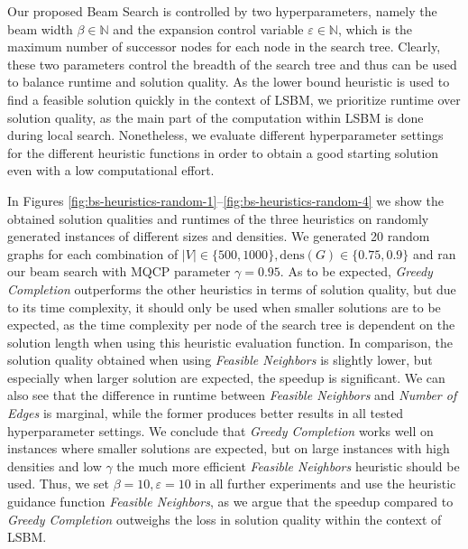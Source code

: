\documentclass[draft,final]{vutinfth} %
\begin{document}
Our proposed Beam Search is controlled by two hyperparameters, namely the beam width $\beta \in \mathbb{N}$ and the expansion control variable $\varepsilon \in \mathbb{N}$, which is the maximum number of successor nodes for each node in the search tree. Clearly, these two parameters control the breadth of the search tree and thus can be used to balance runtime and solution quality. 
As the lower bound heuristic is used to find a feasible solution quickly in the context of LSBM, we prioritize runtime over solution quality, as the main part of the computation within LSBM is done during local search. Nonetheless, we evaluate different hyperparameter settings for the different heuristic functions in order to obtain a good starting solution even with a low computational effort. 

In Figures \ref{fig:bs-heuristics-random-1}--\ref{fig:bs-heuristics-random-4} 
we show the obtained solution qualities and runtimes of the three heuristics on randomly generated instances of different sizes and densities. We generated 20 random graphs for each combination of $|V| \in \{500, 1000\}, \mathrm{dens}(G) \in \{0.75, 0.9\}$ and ran our beam search with MQCP parameter $\gamma=0.95$. 
As to be expected, \emph{Greedy Completion} outperforms the other heuristics in terms of solution quality, but due to its time complexity, it should only be used when smaller solutions are to be expected, as the time complexity per node of the search tree is dependent on the solution length when using this heuristic evaluation function. 
In comparison, the solution quality obtained when using \emph{Feasible Neighbors} is slightly lower, but especially when larger solution are expected, the speedup is significant.  
We can also see that the difference in runtime between \emph{Feasible Neighbors} and \emph{Number of Edges} is marginal, while the former produces better results in all tested hyperparameter settings. 
We conclude that \emph{Greedy Completion} works well on instances where smaller solutions are expected, but on large instances with high densities and low $\gamma$ the much more efficient \emph{Feasible Neighbors} heuristic should be used. 
Thus, we set $\beta=10, \varepsilon=10$ in all further experiments and use the heuristic guidance function \emph{Feasible Neighbors}, as we argue that the speedup compared to \emph{Greedy Completion} outweighs the loss in solution quality within the context of LSBM. 
\end{document}
